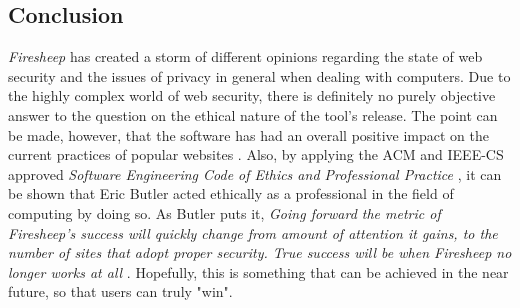 \documentclass[11pt]{article}
\begin{document}
\begin{multicols}{2}
\section{Conclusion}
\emph{Firesheep} has created a storm of different opinions regarding the state of web security and the issues of privacy in general when dealing with computers. Due to the highly complex world of web security, there is definitely no purely objective answer to the question on the ethical nature of the tool's release. The point can be made, however, that the software has had an overall positive impact on the current practices of popular websites \cite{github_reaction} \cite{facebook_reaction} \cite{twitter_reaction}. Also, by applying the ACM and IEEE-CS approved \emph{Software Engineering Code of Ethics and Professional Practice} \cite{se_code}, it can be shown that Eric Butler acted ethically as a professional in the field of computing by doing so. As Butler puts it, \emph{Going forward the metric of Firesheep’s success will quickly change from amount of attention it gains, to the number of sites that adopt proper security. True success will be when Firesheep no longer works at all} \cite{codebutler_blog_2}. Hopefully, this is something that can be achieved in the near future, so that users can truly "win".

\end{multicols}
\newpage
\nocite{*}


\end{document}

